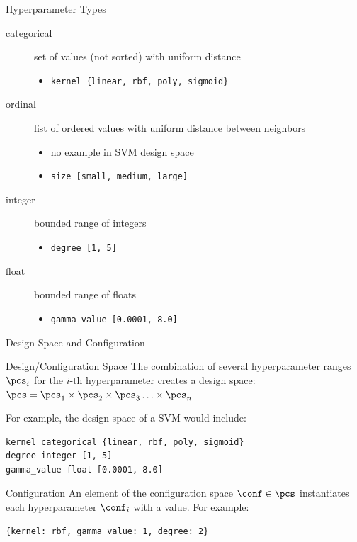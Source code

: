 \begin{frame}[c]{Hyperparameter Types}

\begin{description}
	\item[categorical] set of values (not sorted) with uniform distance
	\begin{itemize}
	  \item \texttt{kernel \{linear, rbf, poly, sigmoid\}}
	\end{itemize}
	\pause
	\item[ordinal] list of ordered values with uniform distance between neighbors
	\begin{itemize}
	  \item no example in SVM design space
	  \item \texttt{size [small, medium, large]}
	\end{itemize}
	\pause
	\item[integer] bounded range of integers
	\begin{itemize}
	  \item \texttt{degree [1, 5]}
	\end{itemize}
	\pause
	\item[float] bounded range of floats
	\begin{itemize}
	  \item \texttt{gamma\_value [0.0001, 8.0]}
	\end{itemize}
\end{description}

\end{frame}
\begin{frame}[c,fragile]{Design Space and Configuration}

\begin{block}{Design/Configuration Space}
The combination of several hyperparameter ranges $\pcs_i$ for the $i$-th hyperparameter creates a design space:
$\pcs = \pcs_1 \times \pcs_2 \times \pcs_3 \ldots \times \pcs_n$ 

\pause
\bigskip

For example, the design space of a SVM would include:

\begin{verbatim}
kernel categorical {linear, rbf, poly, sigmoid}
degree integer [1, 5]
gamma_value float [0.0001, 8.0]
\end{verbatim}
\end{block}

\pause

\begin{block}{Configuration}
An element of the configuration space $\conf \in \pcs$ instantiates each hyperparameter $\conf_i$ with a value.
For example:
\begin{verbatim}
{kernel: rbf, gamma_value: 1, degree: 2}
\end{verbatim}

\end{block}

\end{frame}

